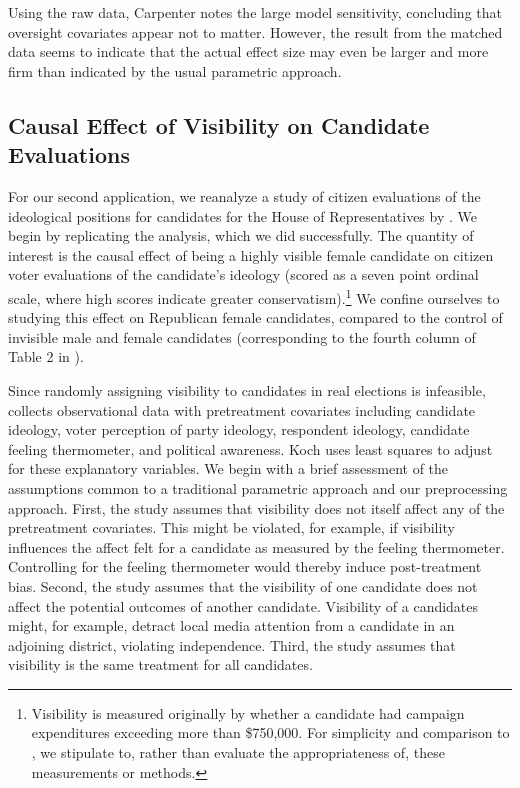 \documentclass[11pt,titlepage]{article}
\begin{document}
Using the raw data, Carpenter notes the large model sensitivity,
concluding that oversight covariates appear not to matter.  However,
the result from the matched data seems to indicate that the actual
effect size may even be larger and more firm than indicated by the
usual parametric approach.

\subsection{Causal Effect of Visibility on Candidate
  Evaluations}

For our second application, we reanalyze a study of citizen
evaluations of the ideological positions for candidates for the House
of Representatives by \citet{Koch02}.  We begin by replicating the
analysis, which we did successfully.  The quantity of interest is the
causal effect of being a highly visible female candidate on citizen
voter evaluations of the candidate's ideology (scored as a seven point
ordinal scale, where high scores indicate greater
conservatism).\footnote{Visibility is measured originally by whether a
  candidate had campaign expenditures exceeding more than \$750,000.
  For simplicity and comparison to \citet{Koch02}, we stipulate to,
  rather than evaluate the appropriateness of, these measurements or
  methods.}  We confine ourselves to studying this effect on
Republican female candidates, compared to the control of invisible
male and female candidates (corresponding to the fourth column of
Table 2 in \citet[p.  459]{Koch02}).

Since randomly assigning visibility to candidates in real elections is
infeasible, \citet{Koch02} collects observational data with
pretreatment covariates including candidate ideology, voter perception
of party ideology, respondent ideology, candidate feeling thermometer,
and political awareness.  Koch uses least squares to adjust for these
explanatory variables.  We begin with a brief assessment of the
assumptions common to a traditional parametric approach and our
preprocessing approach.  First, the study assumes that visibility does
not itself affect any of the pretreatment covariates.  This might be
violated, for example, if visibility influences the affect felt for a
candidate as measured by the feeling thermometer.  Controlling for the
feeling thermometer would thereby induce post-treatment bias.  Second,
the study assumes that the visibility of one candidate does not affect
the potential outcomes of another candidate.  Visibility of a
candidates might, for example, detract local media attention from a
candidate in an adjoining district, violating independence.  Third,
the study assumes that visibility is the same treatment for all
candidates.
\end{document}
